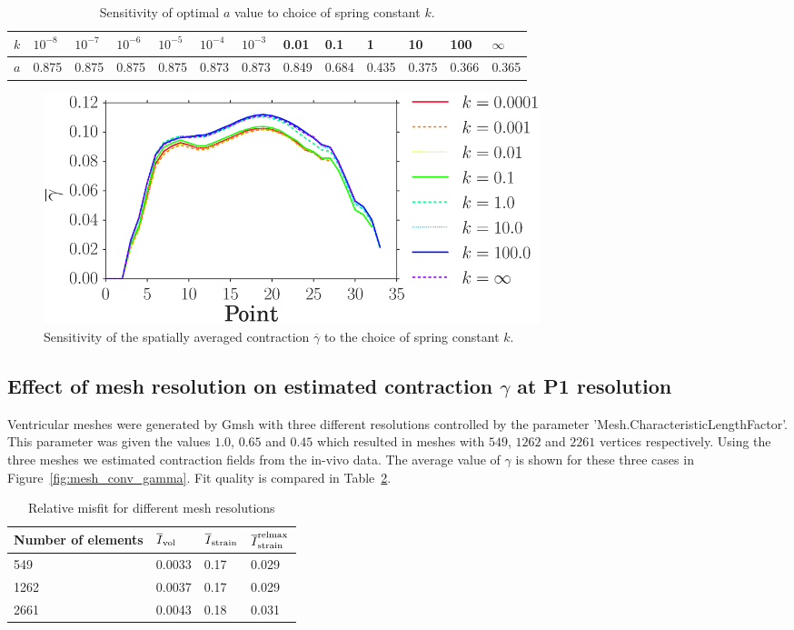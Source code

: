 \begin{table}
\caption{Sensitivity of optimal $a$ value to choice of spring constant $k$.}
\begin{tabular}{|l|llllllllllll|}
\hline
      $k$ & $10^{-8}$ & $10^{-7}$& $10^{-6}$&  $10^{-5}$  & $10^{-4}$ & $10^{-3}$ & 0.01 & 0.1 & 1 & 10 & 100 & $\infty$ \\
\hline
      $a$ & 0.875   & 0.875  & 0.875  & 0.875 & 0.873& 0.873 & 0.849 & 0.684 & 0.435 & 0.375& 0.366 & 0.365 \\
\hline
\end{tabular}
\label{tab:elast_sense}
\end{table}

\begin{figure}[t]
\includegraphics[width=0.7\textwidth]{gamma_mean}
\caption{Sensitivity of the spatially averaged 
contraction $\overline{\gamma}$ to the choice of spring constant $k$.}
\label{fig:gamma_sense}
\end{figure}


\subsection{Effect of mesh resolution on estimated contraction $\gamma$ at P1 resolution}
\label{sec:mesh_res}
Ventricular meshes were generated by Gmsh
\cite{geuzaine2009gmsh} with three different resolutions controlled by the parameter
'Mesh.CharacteristicLengthFactor'.  This parameter
was given the values $1.0$, $0.65$ and $0.45$ which resulted in meshes with
$549$, $1262$ and $2261$ vertices respectively. Using the three meshes
we estimated contraction fields from the in-vivo data. The average value of
$\gamma$ is shown for these three cases in Figure~\ref{fig:mesh_conv_gamma}. 
Fit quality is compared in Table~\ref{tab:mesh_conv_opt_misfit}.

\begin{table}
\caption{Relative misfit for different mesh resolutions}
\begin{tabular}{llll}
\toprule
Number of elements & $\overline{I}_{\text{vol}}$ & $\overline{I}_{\text{strain}}$ & $\overline{I}^{\text{relmax}}_{\text{strain}}$ \\ 
\midrule
549  & 0.0033 & 0.17 & 0.029 \\
1262 & 0.0037 & 0.17 & 0.029 \\
2661 & 0.0043 & 0.18 & 0.031 \\
\bottomrule	
\end{tabular}
\label{tab:mesh_conv_opt_misfit}
\end{table}

